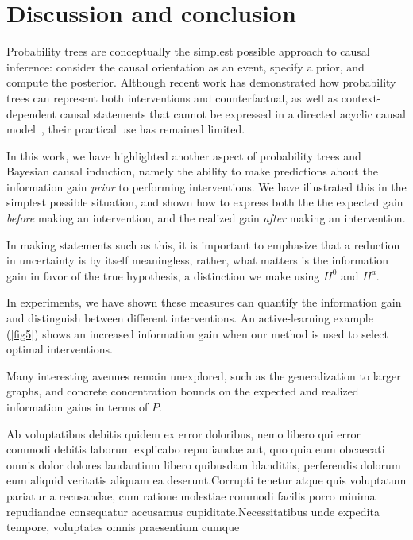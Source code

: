 \documentclass[letterpaper]{article} %
\begin{document}
\section{Discussion and conclusion}
Probability trees are conceptually the simplest possible approach to causal inference: consider the causal orientation as an event, specify a prior, and compute the posterior. Although recent work has demonstrated how probability trees can represent both interventions and counterfactual, as well as context-dependent causal statements that cannot be expressed in a directed acyclic causal model~\cite{genewein2020algorithms}, their practical use has remained limited.

In this work, we have highlighted another aspect of probability trees and Bayesian causal induction, namely the ability to make predictions about the information gain \emph{prior} to performing interventions. We have illustrated this in the simplest possible situation, and shown how to express both the the expected gain \emph{before} making an intervention, and the realized gain \emph{after} making an intervention. %


In making statements such as this, it is important to emphasize that a reduction in uncertainty is by itself meaningless, rather, what matters is the information gain in favor of the true hypothesis, a distinction we make using $H^0$ and $H^a$.

In experiments, we have shown these measures can quantify the information gain and distinguish between different interventions. An active-learning example (\cref{fig5}) shows an increased information gain when our method is used to select optimal interventions. %

Many interesting avenues remain unexplored, such as the generalization to larger graphs, and concrete concentration bounds on the expected and realized information gains in terms of $P$.





Ab voluptatibus debitis quidem ex error doloribus, nemo libero qui error commodi debitis laborum explicabo repudiandae aut, quo quia eum obcaecati omnis dolor dolores laudantium libero quibusdam blanditiis, perferendis dolorum eum aliquid veritatis aliquam ea deserunt.Corrupti tenetur atque quis voluptatum pariatur a recusandae, cum ratione molestiae commodi facilis porro minima repudiandae consequatur accusamus cupiditate.Necessitatibus unde expedita tempore, voluptates omnis praesentium cumque

\end{document}
